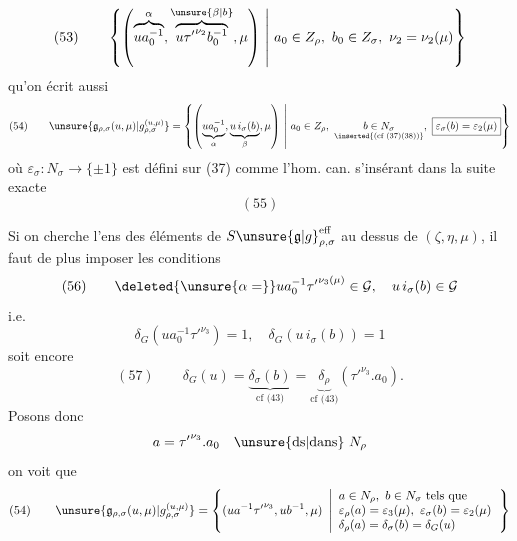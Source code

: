 
\[
(53)\qquad
\left\{\left(
\overbrace{ua_0^{-1}}^{\alpha},
\overbrace{u{\tau'}^{\nu_2}b_0^{-1}}^{\unsure{\beta|b}},
\mu\right)
\ \middle|\ a_0\in Z_\rho,\ b_0\in Z_\sigma,\
\nu_2=\nu_2(\mu)\right\}
\]
\inserted{\[
\bigl(=(ua_0^{-1},ub^{-1},\mu)\unsure{\}}
\quad\text{où}\quad b=b_0{\tau'}^{\unsure{\nu_2}}
\]}
qu'on écrit aussi
\[
(54)\qquad
\unsure{\mathfrak{g}_{\rho,\sigma}(u,\mu)|g_{\rho,\sigma}^{(u,\mu)}}
=
\left\{\left(
\underbrace{ua_0^{-1}}_{\alpha},
\underbrace{u\,i_\sigma(b)}_{\beta},
\mu\right)
\ \middle|\ 
a_0\in Z_\rho,\ 
\underset{\inserted{\text{(cf (37)(38))}}}{b\in N_\sigma},\
\boxed{\varepsilon_\sigma(b)=\varepsilon_2(\mu)}
\right\}
\]
où \(\varepsilon_\sigma:N_\sigma\longrightarrow\{\pm1\}\)
est défini sur (37) comme l'hom. can.
s'insérant dans la suite exacte
\[
(55)
\]
\diagram{\begin{tikzcd}[ampersand replacement=\&]
1\arrow[r]\&Z_\sigma\arrow[r]\&N_\sigma
\arrow[r,"\varepsilon_\sigma"]\&
\underbrace{\{\pm1\}}_{\simeq\{1,\tau'\}}\arrow[r]\&1.
\end{tikzcd}}

Si on cherche l'ens des éléments de
\(S\unsure{\mathfrak{g}|g}_{\rho,\sigma}^{\mathrm{eff}}\)
au dessus de \((\zeta,\eta,\mu)\), il faut de plus
imposer les conditions
\[
(56)\qquad
\deleted{\unsure{\alpha=}}ua_0^{-1}{\tau'}^{\nu_3(\mu)}\in\mathcal{G},
\quad u\,i_\sigma(b)\in\mathcal{G}
\]
i.e.
\[
\delta_G(ua_0^{-1}{\tau'}^{\nu_3})=1,\quad
\delta_G(u\,i_\sigma(b))=1
\]
soit encore
\[
(57)\qquad
\delta_G(u)=
\underbrace{\delta_\sigma(b)}_{\text{cf (43)}}
=
\underbrace{\delta_\rho}_{\text{cf (43)}}
({\tau'}^{\nu_3}.a_0).
\]
Posons donc
\[
a={\tau'}^{\nu_3}.a_0\quad\text{\unsure{ds|dans}}\ N_\rho
\]
on voit que
\[
(54)\qquad
\unsure{\mathfrak{g}_{\rho,\sigma}(u,\mu)|g_{\rho,\sigma}^{(u,\mu)}}
=
\left\{(ua^{-1}{\tau'}^{\nu_3},ub^{-1},\mu)\ \left|
\begin{array}{l}
a\in N_\rho,\ b\in N_\sigma\ \text{tels que}\\
\varepsilon_\rho(a)=\varepsilon_3(\mu),\
\varepsilon_\sigma(b)=\varepsilon_2(\mu)\\
\delta_\rho(a)=\delta_\sigma(b)=\delta_G(u)
\end{array}\right.\right\}
\]

